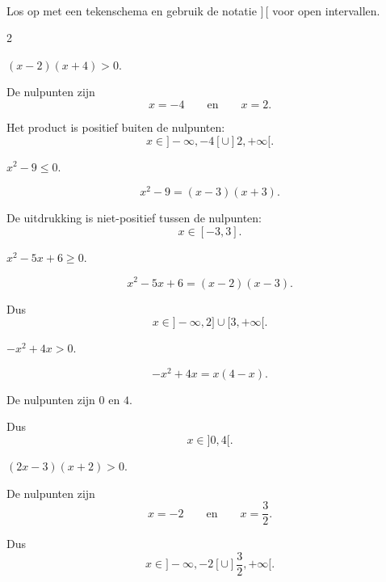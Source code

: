 \documentclass{ximera}
\begin{document}
\begin{oefening}[Tekenschema's]{\oefU\ESS}
\\

Los op met een tekenschema en gebruik de notatie $]\,[$ voor open intervallen.

\begin{multicols}{2}

\begin{question}
$(x-2)(x+4)>0$.

\begin{oplossing}
De nulpunten zijn
\[
x=-4
\qquad\text{en}\qquad
x=2.
\]

Het product is positief buiten de nulpunten:
\[
x\in]-\infty,-4[\cup]2,+\infty[.
\]
\end{oplossing}
\end{question}


\begin{question}
$x^2-9\leq0$.

\begin{oplossing}
\[
x^2-9=(x-3)(x+3).
\]

De uitdrukking is niet-positief tussen de nulpunten:
\[
x\in[-3,3].
\]
\end{oplossing}
\end{question}


\begin{question}
$x^2-5x+6\geq0$.

\begin{oplossing}
\[
x^2-5x+6
=(x-2)(x-3).
\]

Dus
\[
x\in]-\infty,2]\cup[3,+\infty[.
\]
\end{oplossing}
\end{question}


\begin{question}
$-x^2+4x>0$.

\begin{oplossing}
\[
-x^2+4x=x(4-x).
\]

De nulpunten zijn $0$ en $4$.

Dus
\[
x\in]0,4[.
\]
\end{oplossing}
\end{question}


\begin{question}
$(2x-3)(x+2)>0$.

\begin{oplossing}
De nulpunten zijn
\[
x=-2
\qquad\text{en}\qquad
x=\frac32.
\]

Dus
\[
x\in]-\infty,-2[
\cup
]\frac32,+\infty[.
\]
\end{oplossing}
\end{question}



\end{multicols}
\end{oefening}
\end{document}
